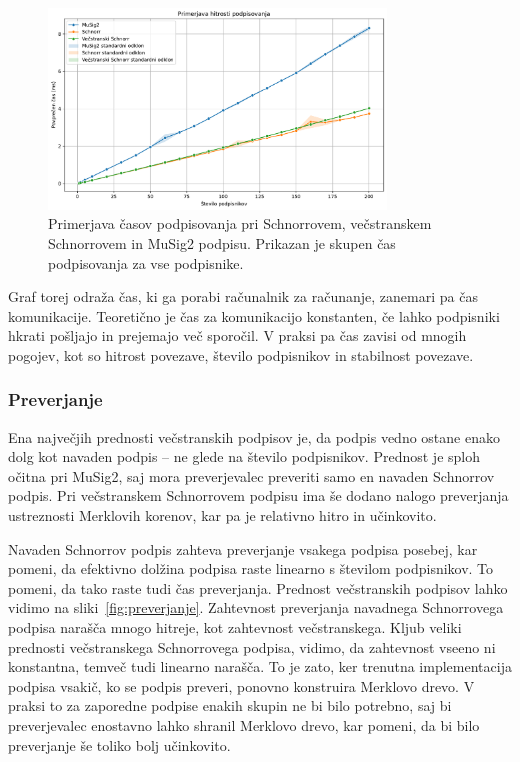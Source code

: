 \begin{figure}[ht]
  \centering
  \includegraphics[width=0.8\textwidth]{images/benchmark_Signing.pdf}
  \caption[Podpisovanje.]{Primerjava časov podpisovanja pri Schnorrovem, večstranskem Schnorrovem
      in MuSig2 podpisu. Prikazan je skupen čas podpisovanja za vse podpisnike.}
  \label{fig:podpisovanje}
\end{figure}

Graf torej odraža čas, ki ga porabi računalnik za računanje, zanemari pa čas komunikacije. Teoretično
je čas za komunikacijo konstanten, če lahko podpisniki hkrati pošljajo in prejemajo več sporočil.
V praksi pa čas zavisi od mnogih pogojev, kot so hitrost povezave, število podpisnikov in stabilnost
povezave.

\subsubsection{Preverjanje}
Ena največjih prednosti večstranskih podpisov je, da podpis vedno ostane enako dolg kot navaden podpis
– ne glede na število podpisnikov. Prednost je sploh očitna pri MuSig2, saj mora preverjevalec preveriti
samo en navaden Schnorrov podpis. Pri večstranskem Schnorrovem podpisu ima še dodano nalogo preverjanja
ustreznosti Merklovih korenov, kar pa je relativno hitro in učinkovito.

Navaden Schnorrov podpis zahteva preverjanje vsakega podpisa posebej, kar pomeni, da efektivno
dolžina podpisa raste linearno s številom podpisnikov. To pomeni, da tako raste tudi čas preverjanja.
Prednost večstranskih podpisov lahko vidimo na sliki~\ref{fig:preverjanje}. Zahtevnost preverjanja
navadnega Schnorrovega podpisa narašča mnogo hitreje, kot zahtevnost večstranskega. Kljub veliki
prednosti večstranskega Schnorrovega podpisa, vidimo, da zahtevnost vseeno ni konstantna, temveč tudi
linearno narašča. To je zato, ker trenutna implementacija podpisa vsakič, ko se podpis preveri, ponovno
konstruira Merklovo drevo. V praksi to za zaporedne podpise enakih skupin ne bi bilo potrebno,
saj bi preverjevalec enostavno lahko shranil Merklovo drevo, kar pomeni, da bi bilo preverjanje še
toliko bolj učinkovito.

